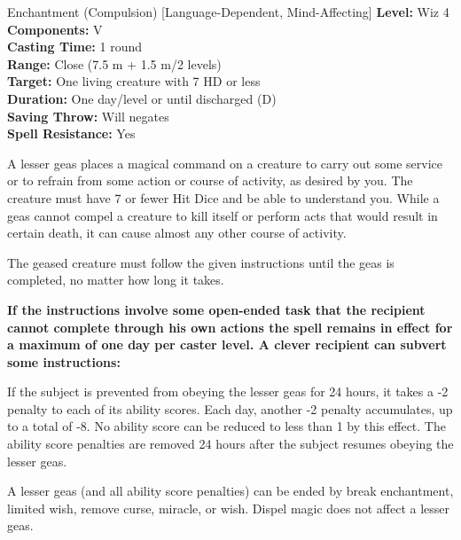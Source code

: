{Enchantment (Compulsion) [Language-Dependent, Mind-Affecting]}
{
	\textbf{Level:}
	Wiz 4\\
	\textbf{Components:}
	V\\
	\textbf{Casting Time:}
	1 round\\
	\textbf{Range:}
	Close (7.5 m + 1.5 m/2 levels)\\
	\textbf{Target:}
	One living creature with 7 HD or less\\
	\textbf{Duration:}
	One day/level or until discharged (D)\\
	\textbf{Saving Throw:}
	Will negates\\
	\textbf{Spell Resistance:}
	Yes\\
}
{
	A lesser geas places a magical command on a creature to carry out some service or to refrain from some action or course of activity, as desired by you. The creature must have 7 or fewer Hit Dice and be able to understand you. While a geas cannot compel a creature to kill itself or perform acts that would result in certain death, it can cause almost any other course of activity.

	The geased creature must follow the given instructions until the geas is completed, no matter how long it takes.

	\textbf{	If the instructions involve some open-ended task that the recipient cannot complete through his own actions the spell remains in effect for a maximum of one day per caster level. A clever recipient can subvert some instructions:}

	If the subject is prevented from obeying the lesser geas for 24 hours, it takes a -2 penalty to each of its ability scores. Each day, another -2 penalty accumulates, up to a total of -8. No ability score can be reduced to less than 1 by this effect. The ability score penalties are removed 24 hours after the subject resumes obeying the lesser geas.

	A lesser geas (and all ability score penalties) can be ended by break enchantment, limited wish, remove curse, miracle, or wish. Dispel magic does not affect a lesser geas.

}

